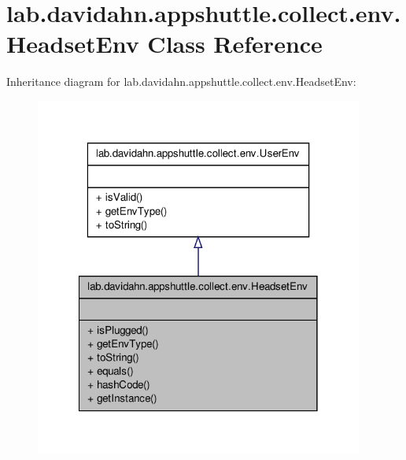 \hypertarget{classlab_1_1davidahn_1_1appshuttle_1_1collect_1_1env_1_1_headset_env}{\section{lab.\-davidahn.\-appshuttle.\-collect.\-env.\-Headset\-Env \-Class \-Reference}
\label{classlab_1_1davidahn_1_1appshuttle_1_1collect_1_1env_1_1_headset_env}
}


\-Inheritance diagram for lab.\-davidahn.\-appshuttle.\-collect.\-env.\-Headset\-Env\-:
\nopagebreak
\begin{figure}[H]
\begin{center}
\leavevmode
\includegraphics[width=306pt]{classlab_1_1davidahn_1_1appshuttle_1_1collect_1_1env_1_1_headset_env__inherit__graph}
\end{center}
\end{figure}


